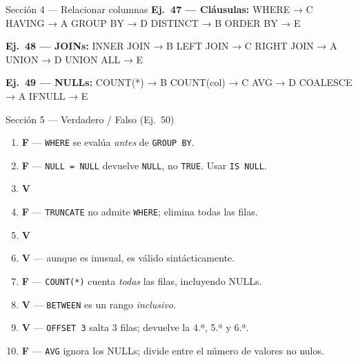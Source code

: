 \documentclass[12pt, a4paper]{article}
\begin{document}
\begin{solucionbox}{Sección 4 — Relacionar columnas}
\textbf{Ej.~47 — Cláusulas:}
WHERE → C \quad HAVING → A \quad GROUP BY → D \quad
DISTINCT → B \quad ORDER BY → E

\medskip
\textbf{Ej.~48 — JOINs:}
INNER JOIN → B \quad LEFT JOIN → C \quad RIGHT JOIN → A \quad
UNION → D \quad UNION ALL → E

\medskip
\textbf{Ej.~49 — NULLs:}
COUNT(*) → B \quad COUNT(col) → C \quad AVG → D \quad
COALESCE → A \quad IFNULL → E
\end{solucionbox}

\begin{solucionbox}{Sección 5 — Verdadero / Falso (Ej.~50)}
\begin{enumerate}[label=\arabic*., leftmargin=1.5em, itemsep=3pt]
  \item \textbf{F} — \texttt{WHERE} se evalúa \emph{antes} de \texttt{GROUP BY}.
  \item \textbf{F} — \texttt{NULL = NULL} devuelve \texttt{NULL}, no \texttt{TRUE}. Usar \texttt{IS NULL}.
  \item \textbf{V}
  \item \textbf{F} — \texttt{TRUNCATE} no admite \texttt{WHERE}; elimina todas las filas.
  \item \textbf{V}
  \item \textbf{V} — aunque es inusual, es válido sintácticamente.
  \item \textbf{F} — \texttt{COUNT(*)} cuenta \emph{todas} las filas, incluyendo NULLs.
  \item \textbf{V} — \texttt{BETWEEN} es un rango \emph{inclusivo}.
  \item \textbf{V} — \texttt{OFFSET 3} salta 3 filas; devuelve la 4.ª, 5.ª y 6.ª.
  \item \textbf{F} — \texttt{AVG} ignora los NULLs; divide entre el número de valores no nulos.
\end{enumerate}
\end{solucionbox}
\end{document}
